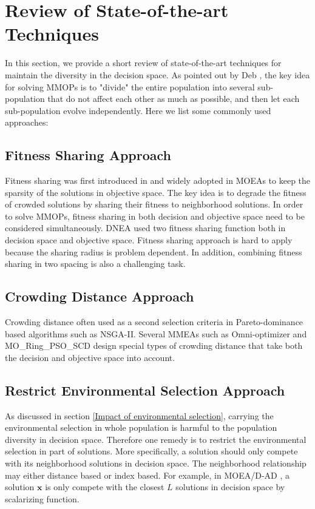 \documentclass[conference]{IEEEtran}
\begin{document}
\section{Review of State-of-the-art Techniques}
\label{Review of State-of-the-art Techniques}
In this section, we provide a short review of state-of-the-art techniques for maintain the diversity in the decision space. As pointed out by Deb \cite{Deb2001}, the key idea for solving MMOPs is to "divide" the entire population into several sub-population that do not affect each other as much as possible, and then let each sub-population evolve independently. Here we list some commonly used approaches:
\subsection{Fitness Sharing Approach}
Fitness sharing was first introduced in \cite{Goldberg} and widely adopted in MOEAs to keep the sparsity of the solutions in objective space. The key idea is to degrade the fitness of crowded solutions by sharing their fitness to neighborhood solutions. In order to solve MMOPs, fitness sharing in both decision and objective space need to be considered simultaneously. DNEA\cite{DNEA} used two fitness sharing function both in decision space and objective space. Fitness sharing approach is hard to apply because the sharing radius is problem dependent. In addition, combining fitness sharing in two spacing is also a challenging task.
\subsection{Crowding Distance Approach}
Crowding distance often used as a second selection criteria in Pareto-dominance based algorithms such as NSGA-II\cite{NSGA-II}. Several MMEAs such as Omni-optimizer\cite{Omni-Optimizer} and MO\_Ring\_PSO\_SCD\cite{MO-Ring-PSO-SCD} design special types of crowding distance that take both the decision and objective space into account.
\subsection{Restrict Environmental Selection Approach}
As discussed in section \ref{Impact of environmental selection}, carrying the environmental selection in whole population is harmful to the population diversity in decision space. Therefore one remedy is to restrict the environmental selection in part of solutions. More specifically, a solution should only compete with its neighborhood solutions in decision space. The neighborhood relationship may either distance based or index based. For example, in MOEA/D-AD \cite{MOEA/D-AD}, a solution $\boldsymbol{x}$ is only compete with the closest $L$ solutions in decision space by scalarizing function.
\end{document}
